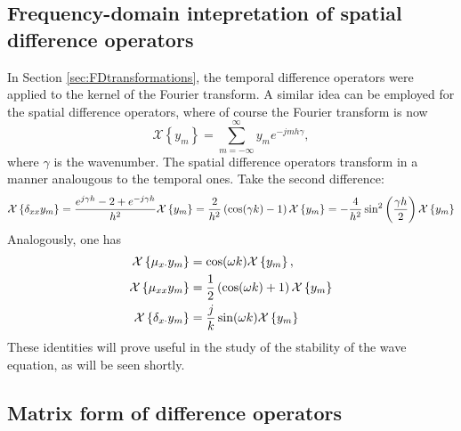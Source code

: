 \subsection{Frequency-domain intepretation of spatial difference operators}\label{sec:FDtransformationsSpatial}

In Section \ref{sec:FDtransformations}, the temporal difference operators were applied to the kernel of the Fourier transform. A similar idea can be employed for the spatial difference operators, where of course the Fourier transform is now
\begin{equation}
\mathcal{X}\left\{ y_m \right\} = \sum_{m=-\infty}^\infty y_m e^{-jmh\gamma},
\end{equation}
where $\gamma$ is the wavenumber. The spatial difference operators transform in a manner analougous to the temporal ones. Take the second difference:
\begin{equation}\label{eq:DTFTdss}
\mathcal{X}\left\{\delta_{xx} y_m\right\} = \frac{e^{j\gamma h}-2+e^{-j\gamma h}}{h^2}\mathcal{X}\left\{y_m\right\}=\frac{2}{h^2}\left(\cos(\gamma k)-1 \right)\mathcal{X}\left\{y_m\right\} = -\frac{4}{h^2} \sin^2\left(\frac{\gamma h}{2}\right)\mathcal{X}\left\{y_m\right\}
\end{equation}
Analogously, one has
\begin{subequations}
\begin{align}
\mathcal{X}\left\{\mu_{x\cdot} y_m\right\} &= \cos(\omega k) \mathcal{X}\left\{y_m \right\}, \\
\mathcal{X}\left\{\mu_{xx} y_m\right\} &= \frac{1}{2}\left(\cos(\omega k) + 1\right)\mathcal{X}\left\{y_m \right\} \\
\mathcal{X}\left\{\delta_{x\cdot} y_m\right\} &= \frac{j}{k}\sin(\omega k) \mathcal{X}\left\{y_m \right\}
\end{align}
\end{subequations}
These identities will prove useful in the study of the stability of the wave equation, as will be seen shortly. 





\subsection{Matrix form of difference operators}


